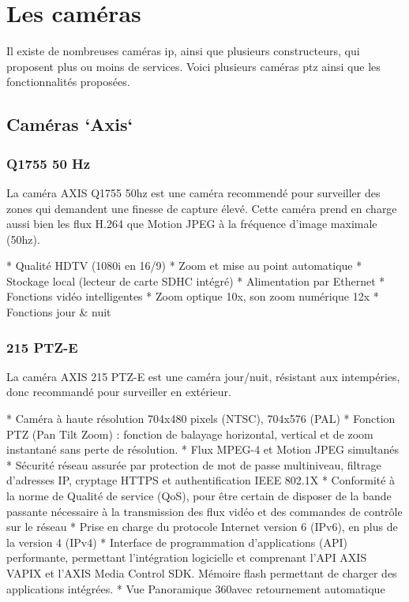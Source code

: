 \section{Les caméras}
 Il existe de nombreuses caméras ip, ainsi que plusieurs constructeurs, qui
 proposent plus ou moins de services. Voici plusieurs caméras ptz ainsi que les
 fonctionnalités proposées.
 \subsection{Caméras `Axis`}
 	\subsubsection{Q1755 50 Hz}
 La caméra AXIS Q1755 50hz est une caméra recommendé pour surveiller des zones
 qui demandent une finesse de capture élevé.
 Cette caméra prend en charge aussi bien les flux H.264 que Motion JPEG à la
 fréquence d'image maximale (50hz).
 
    * Qualité HDTV (1080i en 16/9)
    * Zoom et mise au point automatique
    * Stockage local (lecteur de carte SDHC intégré)
    * Alimentation par Ethernet
    * Fonctions vidéo intelligentes
 	* Zoom optique 10x, son zoom numérique 12x
 	* Fonctions jour \& nuit
 	
 	\subsubsection{215 PTZ-E}
La caméra AXIS 215 PTZ-E est une caméra jour/nuit, résistant aux intempéries,
donc recommandé pour surveiller en extérieur.

    * Caméra à haute résolution 704x480 pixels (NTSC), 704x576 (PAL)
    * Fonction PTZ (Pan Tilt Zoom) : fonction de balayage horizontal, vertical
    et de zoom instantané sans perte de résolution. * Flux MPEG-4 et Motion JPEG simultanés
    * Sécurité réseau assurée par protection de mot de passe multiniveau,
    filtrage d’adresses IP, cryptage HTTPS et authentification IEEE 802.1X 
    * Conformité à la norme de Qualité de service (QoS), pour être certain de
    disposer de la bande passante nécessaire à la transmission des flux vidéo et
    des commandes de contrôle sur le réseau 
    * Prise en charge du protocole Internet version 6 (IPv6), en plus de la version 4 (IPv4) 
    * Interface de programmation d’applications (API) performante, permettant
    l’intégration logicielle et comprenant l’API AXIS VAPIX et l’AXIS Media
    Control SDK. Mémoire flash permettant de charger des applications intégrées.
 	* Vue Panoramique 360\degre avec retournement automatique
    

